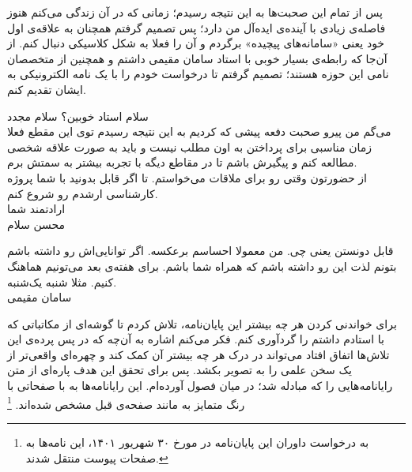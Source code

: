 پس از تمام این صحبت‌ها به این نتیجه رسیدم؛ زمانی که در آن زندگی می‌کنم هنوز فاصله‌ی زیادی با آینده‌ی ایده‌آل من دارد؛ پس تصمیم گرفتم همچنان به علاقه‌ی اول خود یعنی «سامانه‌های پیچیده» برگردم و آن را فعلا به شکل کلاسیکی دنبال کنم. از آن‌جا که رابطه‌ی بسیار خوبی با استاد سامان مقیمی داشتم و همچنین از متخصصان نامی این حوزه هستند؛ تصمیم گرفتم تا درخواست خودم را با یک نامه الکترونیکی به ایشان تقدیم کنم.
\begin{mohsenletter}

	سلام استاد خوبین؟ سلام مجدد\\
	می‌گم من پیرو صحبت دفعه پیشی که کردیم به این نتیجه رسیدم توی این مقطع فعلا زمان مناسبی برای پرداختن به اون مطلب نیست و باید به صورت علاقه شخصی مطالعه کنم و پیگیرش باشم تا در مقاطع دیگه با تجربه بیشتر به سمتش برم.\\
	
	از حضورتون وقتی رو برای ملاقات می‌خواستم. تا اگر قابل بدونید با شما پروژه کارشناسی ارشدم رو شروع کنم.\\
	
	ارادتمند شما\\
	محسن
	\medskip
	سلام
	
	قابل دونستن یعنی چی. من معمولا احساسم برعکسه. اگر توانایی‌اش رو داشته باشم بتونم لذت این رو داشته باشم که همراه شما باشم.
	برای هفته‌ی بعد می‌تونیم هماهنگ کنیم. مثلا شنبه یک‌شنبه.\\
	
	سامان مقیمی
\end{mohsenletter}


\newpage
{}
برای خواندنی کردن هر چه بیشتر این پایان‌نامه، تلاش کردم تا گوشه‌ای از مکاتباتی که با استادم داشتم را گردآوری کنم. فکر می‌کنم اشاره به آن‌چه که  در پس پرده‌ی این تلاش‌ها اتفاق افتاد می‌تواند در درک هر چه بیشتر آن کمک کند و چهره‌ای واقعی‌تر از یک سخن علمی را به تصویر بکشد. پس برای تحقق این هدف پاره‌ای از متن رایانامه‌هایی را که مبادله شد؛ در میان فصول آورده‌ام. این رایانامه‌ها به با صفحاتی با رنگ متمایز به مانند صفحه‌ی قبل مشخص شده‌اند.
\footnote{
به درخواست داوران این پایان‌نامه در مورخ ۳۰ شهریور ۱۴۰۱، این نامه‌ها به صفحات پیوست منتقل شدند.
}
